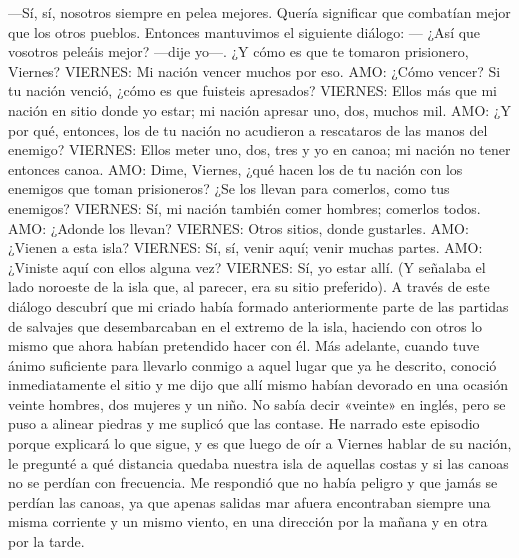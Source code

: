 \documentclass{novela}
\begin{document}
    —Sí, sí, nosotros siempre en pelea mejores.
    Quería significar que combatían mejor que los otros pueblos. Entonces mantuvimos el siguiente diálogo:
    — ¿Así que vosotros peleáis mejor? —dije yo—. ¿Y cómo es que te tomaron prisionero, Viernes?
    VIERNES: Mi nación vencer muchos por eso.
    AMO: ¿Cómo vencer? Si tu nación venció, ¿cómo es que fuisteis apresados?
    VIERNES: Ellos más que mi nación en sitio donde yo estar; mi nación apresar uno, dos, muchos mil.
    AMO: ¿Y por qué, entonces, los de tu nación no acudieron a rescataros de las manos del enemigo?
    VIERNES: Ellos meter uno, dos, tres y yo en canoa; mi nación no tener entonces canoa.
    AMO: Dime, Viernes, ¿qué hacen los de tu nación con los enemigos que toman prisioneros? ¿Se los llevan para comerlos, como tus enemigos?
    VIERNES: Sí, mi nación también comer hombres; comerlos todos.
    AMO: ¿Adonde los llevan?
    VIERNES: Otros sitios, donde gustarles.
    AMO: ¿Vienen a esta isla?
    VIERNES: Sí, sí, venir aquí; venir muchas partes.
    AMO: ¿Viniste aquí con ellos alguna vez?
    VIERNES: Sí, yo estar allí. (Y señalaba el lado noroeste de la isla que, al parecer, era su sitio preferido).
    A través de este diálogo descubrí que mi criado había formado anteriormente parte de las partidas de salvajes que desembarcaban en el extremo de la isla, haciendo con otros lo mismo que ahora habían pretendido hacer con él. Más adelante, cuando tuve ánimo suficiente para llevarlo conmigo a aquel lugar que ya he descrito, conoció inmediatamente el sitio y me dijo que allí mismo habían devorado en una ocasión veinte hombres, dos mujeres y un niño. No sabía decir «veinte» en inglés, pero se puso a alinear piedras y me suplicó que las contase.
    He narrado este episodio porque explicará lo que sigue, y es que luego de oír a Viernes hablar de su nación, le pregunté a qué distancia quedaba nuestra isla de aquellas costas y si las canoas no se perdían con frecuencia. Me respondió que no había peligro y que jamás se perdían las canoas, ya que apenas salidas mar afuera encontraban siempre una misma corriente y un mismo viento, en una dirección por la mañana y en otra por la tarde.
\end{document}
